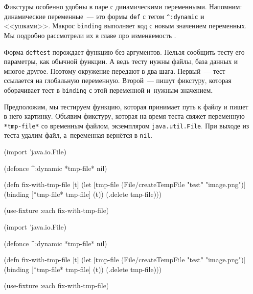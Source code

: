 
Фикстуры особенно удобны в паре с динамическими переменными. Напомним:
динамические переменные~--- это формы \verb|def| с тегом \verb|^:dynamic| и
<<ушками>>. Макрос \verb|binding| выполняет код с новым значением переменных. Мы
подробно рассмотрели их в главе про изменяемость .

Форма \verb|deftest| порождает функцию без аргументов. Нельзя сообщить тесту его
параметры, как обычной функции. А ведь тесту нужны файлы, база данных и многое
другое. Поэтому окружение передают в два шага. Первый~--- тест ссылается на
глобальную переменную. Второй~--- пишут фикстуру, которая оборачивает тест в
\verb|binding| с этой переменной и~нужным значением.

Предположим, мы тестируем функцию, которая принимает путь к файлу и пишет в него
картинку. Объявим фикстуру, которая на время теста свяжет переменную
\verb|*tmp-file*| со временным файлом, экземпляром \verb|java.util.File|. При
выходе из теста удалим файл, а~переменная вернётся в \verb|nil|.


\ifnarrow

\begin{english}
  \begin{clojure}
(import 'java.io.File)

(defonce ^:dynamic *tmp-file* nil)

(defn fix-with-tmp-file [t]
  (let [tmp-file
        (File/createTempFile
          "test" "image.png")]
    (binding [*tmp-file* tmp-file]
      (t))
    (.delete tmp-file)))

(use-fixture :each fix-with-tmp-file)
  \end{clojure}
\end{english}

\else

\begin{english}
  \begin{clojure}
(import 'java.io.File)

(defonce ^:dynamic *tmp-file* nil)

(defn fix-with-tmp-file [t]
  (let [tmp-file (File/createTempFile "test" "image.png")]
    (binding [*tmp-file* tmp-file]
      (t))
    (.delete tmp-file)))

(use-fixture :each fix-with-tmp-file)
  \end{clojure}
\end{english}

